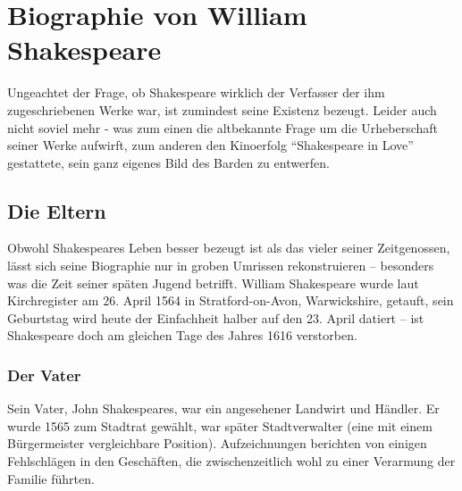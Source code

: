
\chapter{Biographie von William Shakespeare}

Ungeachtet der Frage, ob Shakespeare wirklich der Verfasser der ihm
zugeschriebenen Werke war, ist zumindest seine Existenz bezeugt. Leider auch
nicht soviel mehr - was zum einen die altbekannte Frage um die Urheberschaft
seiner Werke aufwirft, zum anderen den Kinoerfolg "`Shakespeare in Love"'
gestattete, sein ganz eigenes Bild des Barden zu entwerfen.

\section[Die Erzeuger]{Die Eltern}

Obwohl Shakespeares Leben besser bezeugt ist als das vieler seiner
Zeitgenossen, lässt sich seine Biographie nur in groben Umrissen rekonstruieren
-- besonders was die Zeit seiner späten Jugend betrifft. William Shakespeare
wurde laut Kirchregister am 26. April 1564 in Stratford-on-Avon, Warwickshire,
getauft, sein Geburtstag wird heute der Einfachheit halber auf den 23. April
datiert -- ist Shakespeare doch am gleichen Tage des Jahres 1616 verstorben.

\subsection{Der Vater}
Sein Vater, John Shakespeares, war ein angesehener Landwirt und Händler. Er
wurde 1565 zum Stadtrat gewählt, war später Stadtverwalter (eine mit einem
Bürgermeister vergleichbare Position). Aufzeichnungen berichten von einigen
Fehlschlägen in den Geschäften, die zwischenzeitlich wohl zu einer Verarmung
der Familie führten.

